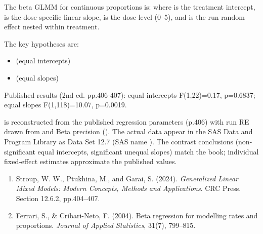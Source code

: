 \documentclass[a4paper]{book}
\begin{document}
%
\begin{Details}
The beta GLMM for continuous proportions is:
where  is the treatment intercept,  is the
dose-specific linear slope,  is the dose level (0–5), and
 is the run random
effect nested within treatment.

The key hypotheses are:
\begin{itemize}

\item{}  (equal intercepts)
\item{}  (equal slopes)

\end{itemize}


Published results (2nd ed. pp.406-407): equal intercepts F(1,22)=0.17,
p=0.6837; equal slopes F(1,118)=10.07, p=0.0019.
\end{Details}
%
\begin{Note}
  is reconstructed from the
published regression parameters (p.406) with run RE drawn from
 and Beta precision  ().
The actual data appear in the SAS Data and Program Library as Data Set 12.7
(SAS name ).  The contrast conclusions
(non-significant equal intercepts, significant unequal slopes) match the
book; individual fixed-effect estimates approximate the published values.
\end{Note}
%
\begin{References}
\begin{enumerate}

\item{} Stroup, W. W., Ptukhina, M., and Garai, S. (2024).
\emph{Generalized Linear Mixed Models: Modern Concepts, Methods and
Applications}. CRC Press. Section 12.6.2, pp.404–407.
\item{} Ferrari, S., \& Cribari-Neto, F. (2004).
Beta regression for modelling rates and proportions.
\emph{Journal of Applied Statistics}, 31(7), 799–815.

\end{enumerate}

\end{References}
%
\begin{SeeAlso}
\end{SeeAlso}
\end{document}

